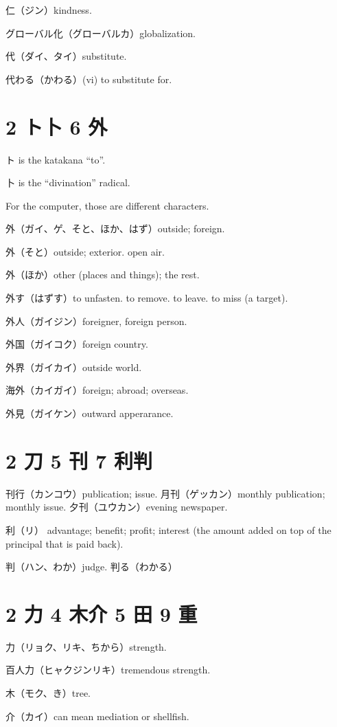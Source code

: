 仁（ジン）kindness.

グローバル化（グローバルカ）globalization.

代（ダイ、タイ）substitute.

代わる（かわる）(vi) to substitute for.

\section{2 ト卜 6 外}

ト is the katakana ``to''.

卜 is the ``divination'' radical.

For the computer, those are different characters.

外（ガイ、ゲ、そと、ほか、はず）outside; foreign.

外（そと）outside; exterior. open air.

外（ほか）other (places and things); the rest.

外す（はずす）to unfasten. to remove. to leave. to miss (a target).

外人（ガイジン）foreigner, foreign person.

外国（ガイコク）foreign country.

外界（ガイカイ）outside world.

海外（カイガイ）foreign; abroad; overseas.

外見（ガイケン）outward apperarance.

\section{2 刀 5 刊 7 利判}

刊行（カンコウ）publication; issue.
月刊（ゲッカン）monthly publication; monthly issue.
夕刊（ユウカン）evening newspaper.

利（リ）
advantage; benefit; profit;
interest (the amount added on top of the principal that is paid back).

判（ハン、わか）judge.
判る（わかる）

\section{2 力 4 木介 5 田 9 重}

力（リョク、リキ、ちから）strength.

百人力（ヒャクジンリキ）tremendous strength.

木（モク、き）tree.

介（カイ）can mean mediation or shellfish.

